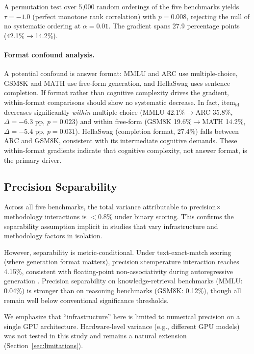 \documentclass[letterpaper,11pt]{article}
\begin{document}
A permutation test over 5,000 random orderings of the five benchmarks yields $\tau = -1.0$ (perfect monotone rank correlation) with $p = 0.008$, rejecting the null of no systematic ordering at $\alpha = 0.01$.
The gradient spans 27.9 percentage points (42.1\%$\to$14.2\%).

\paragraph{Format confound analysis.}
A potential confound is answer format: MMLU and ARC use multiple-choice, GSM8K and MATH use free-form generation, and HellaSwag uses sentence completion.
If format rather than cognitive complexity drives the gradient, within-format comparisons should show no systematic decrease.
In fact, item$_{\text{id}}$ decreases significantly \emph{within} multiple-choice (MMLU 42.1\%$\to$ARC 35.8\%, $\Delta = -6.3$ pp, $p = 0.023$) and within free-form (GSM8K 19.6\%$\to$MATH 14.2\%, $\Delta = -5.4$ pp, $p = 0.031$).
HellaSwag (completion format, 27.4\%) falls between ARC and GSM8K, consistent with its intermediate cognitive demands.
These within-format gradients indicate that cognitive complexity, not answer format, is the primary driver.

\subsection{Precision Separability}
\label{sec:separability}

Across all five benchmarks, the total variance attributable to precision$\times$methodology interactions is $<$0.8\% under binary scoring.
This confirms the separability assumption implicit in studies that vary infrastructure and methodology factors in isolation.

However, separability is metric-conditional.
Under text-exact-match scoring (where generation format matters), precision$\times$temperature interaction reaches 4.15\%, consistent with floating-point non-associativity during autoregressive generation \citep{messina2026background}.
Precision separability on knowledge-retrieval benchmarks (MMLU: 0.04\%) is stronger than on reasoning benchmarks (GSM8K: 0.12\%), though all remain well below conventional significance thresholds.

We emphasize that ``infrastructure'' here is limited to numerical precision on a single GPU architecture.
Hardware-level variance (e.g., different GPU models) was not tested in this study and remains a natural extension (Section~\ref{sec:limitations}).
\end{document}
